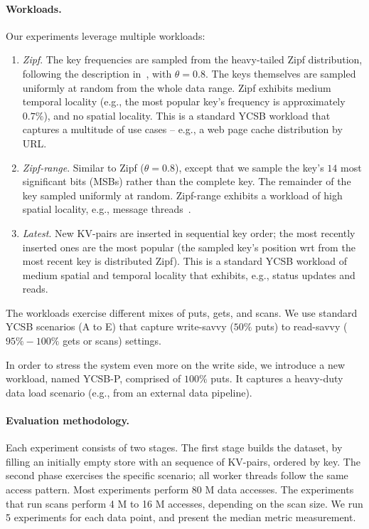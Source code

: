 \paragraph{Workloads.} 
Our experiments leverage multiple workloads: 

\begin{enumerate}
\item {\em Zipf}. The key frequencies are sampled from the heavy-tailed Zipf distribution, 
following the description in~\cite{Gray:1994:QGB:191839.191886}, with $\theta = 0.8$. 
The keys themselves are sampled uniformly at random from the whole data range. Zipf exhibits 
medium temporal locality (e.g., the most popular key's frequency is approximately $0.7\%$), 
and no spatial locality. This is a standard YCSB workload that captures a multitude of use cases 
-- e.g., a web page cache distribution by URL. 

\item {\em Zipf-range}. Similar to Zipf ($\theta=0.8$), except that we sample the key's $14$ most significant bits
(MSBs) rather than the complete key. The remainder of the key sampled uniformly at random. Zipf-range exhibits
a workload of high spatial locality, e.g., message threads~\cite{Borthakur:2011:AHG:1989323.1989438}. 

\item {\em Latest}. New KV-pairs are inserted in sequential key order; the most recently inserted ones are 
the  most popular (the sampled key's position wrt from the most recent key is distributed Zipf). This is a 
standard YCSB workload of medium spatial and temporal locality that exhibits, e.g., status updates and reads. 

\end{enumerate}

The workloads exercise different mixes of puts, gets, and scans. We use standard YCSB scenarios 
(A to E) that capture write-savvy ($50\%$ puts) to read-savvy ($95\%-100\%$ gets or scans) settings. 

In order to stress the system even more on the write side, we introduce a new workload, named 
YCSB-P, comprised of $100\%$ puts. It captures a heavy-duty data load scenario (e.g., from an 
external data pipeline). 

\paragraph{Evaluation methodology.} Each experiment consists of two stages. The first stage builds 
the dataset, by filling an initially empty store with an sequence of KV-pairs, ordered by key. The second 
phase exercises the specific scenario; all worker threads follow the same access pattern. Most experiments 
perform 80 M data accesses. The experiments that run scans perform 4 M to 16 M accesses, depending on 
the scan size. We run 5 experiments for each data point, and present the median metric measurement. 

